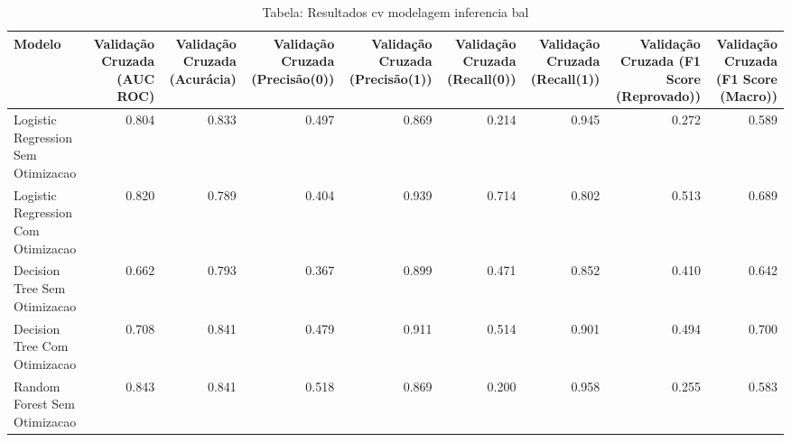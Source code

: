 \begin{table}[H] %
    \centering
    \caption{Tabela: Resultados cv modelagem inferencia bal}
    \label{tab:resultados_cv_modelagem_inferencia_bal}
    \renewcommand{\arraystretch}{1.25} %
    \begin{adjustwidth}{ -1in }{ -1in } %
    \centering %
    \small %
    \begin{tabular}{lrrrrrrrr}
\toprule
                            Modelo &  Validação Cruzada (AUC ROC) &  Validação Cruzada (Acurácia) &  Validação Cruzada (Precisão(0)) &  Validação Cruzada (Precisão(1)) &  Validação Cruzada (Recall(0)) &  Validação Cruzada (Recall(1)) &  Validação Cruzada (F1 Score (Reprovado)) &  Validação Cruzada (F1 Score (Macro)) \\
\midrule
Logistic Regression Sem Otimizacao &                        0.804 &                         0.833 &                            0.497 &                            0.869 &                          0.214 &                          0.945 &                                     0.272 &                                 0.589 \\
Logistic Regression Com Otimizacao &                        0.820 &                         0.789 &                            0.404 &                            0.939 &                          0.714 &                          0.802 &                                     0.513 &                                 0.689 \\
      Decision Tree Sem Otimizacao &                        0.662 &                         0.793 &                            0.367 &                            0.899 &                          0.471 &                          0.852 &                                     0.410 &                                 0.642 \\
      Decision Tree Com Otimizacao &                        0.708 &                         0.841 &                            0.479 &                            0.911 &                          0.514 &                          0.901 &                                     0.494 &                                 0.700 \\
      Random Forest Sem Otimizacao &                        0.843 &                         0.841 &                            0.518 &                            0.869 &                          0.200 &                          0.958 &                                     0.255 &                                 0.583 \\

\end{tabular}
\end{adjustwidth}
\end{table}
